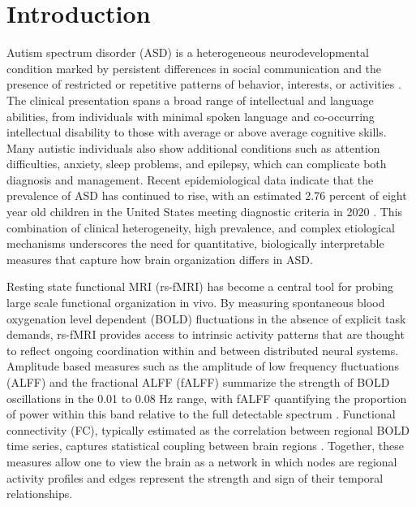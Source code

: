 \documentclass[10pt,letterpaper]{article}
\begin{document}
\clearpage
{}
\linenumbers

\section*{Introduction}

Autism spectrum disorder (ASD) is a heterogeneous neurodevelopmental condition marked by persistent
differences in social communication and the presence of restricted or repetitive patterns of
behavior, interests, or activities \cite{APA:2022ds}. The clinical presentation spans a broad range
of intellectual and language abilities, from individuals with minimal spoken language and
co-occurring intellectual disability to those with average or above average cognitive skills. Many
autistic individuals also show additional conditions such as attention difficulties, anxiety, sleep
problems, and epilepsy, which can complicate both diagnosis and management. Recent epidemiological
data indicate that the prevalence of ASD has continued to rise, with an estimated 2.76 percent of
eight year old children in the United States meeting diagnostic criteria in 2020 \cite{Maenner:2023pr}.
This combination of clinical heterogeneity, high prevalence, and complex etiological mechanisms
underscores the need for quantitative, biologically interpretable measures that capture how brain
organization differs in ASD.

Resting state functional MRI (rs-fMRI) has become a central tool for probing large scale functional
organization in vivo. By measuring spontaneous blood oxygenation level dependent (BOLD) fluctuations
in the absence of explicit task demands, rs-fMRI provides access to intrinsic activity patterns that
are thought to reflect ongoing coordination within and between distributed neural systems. Amplitude
based measures such as the amplitude of low frequency fluctuations (ALFF) and the fractional ALFF
(fALFF) summarize the strength of BOLD oscillations in the 0.01 to 0.08 Hz range, with fALFF
quantifying the proportion of power within this band relative to the full detectable spectrum
\cite{Zang:2007al,Zou:2008fa}. Functional connectivity (FC), typically estimated as the correlation
between regional BOLD time series, captures statistical coupling between brain regions \cite{Smith:2013fc}.
Together, these measures allow one to view the brain as a network in which nodes are regional activity
profiles and edges represent the strength and sign of their temporal relationships.
\end{document}
